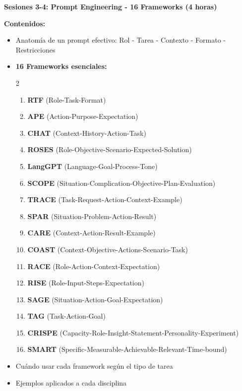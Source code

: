 \documentclass[12pt,a4paper]{yaac-luatex}
\newcommand{\subsecciontitulo}[1]{
	{\color{maincolor}\large\bfseries #1}
}
\begin{document}
	\vspace{0.3cm}
	
	\begin{tcolorbox}[
		enhanced,
		colback=white,
		colframe=curso1color,
		arc=3pt,
		boxrule=1.5pt,
		left=10pt,
		right=10pt,
		top=8pt,
		bottom=8pt,
		breakable
		]

		\subsecciontitulo{Sesiones 3-4: Prompt Engineering - 16 Frameworks (4 horas)}
	
	\textbf{Contenidos:}
	\begin{itemize}[leftmargin=*, itemsep=0.1cm]
		\item Anatomía de un prompt efectivo: Rol - Tarea - Contexto - Formato - Restricciones
		\item \textbf{16 Frameworks esenciales:}
		\begin{multicols}{2}
			\begin{enumerate}[leftmargin=*, itemsep=0.05cm]
				\item \textbf{RTF} (Role-Task-Format)
				\item \textbf{APE} (Action-Purpose-Expectation)
				\item \textbf{CHAT} (Context-History-Action-Task)
				\item \textbf{ROSES} (Role-Objective-Scenario-Expected-Solution)
				\item \textbf{LangGPT} (Language-Goal-Process-Tone)
				\item \textbf{SCOPE} (Situation-Complication-Objective-Plan-Evaluation)
				\item \textbf{TRACE} (Task-Request-Action-Context-Example)
				\item \textbf{SPAR} (Situation-Problem-Action-Result)
				\item \textbf{CARE} (Context-Action-Result-Example)
				\item \textbf{COAST} (Context-Objective-Actions-Scenario-Task)
				\item \textbf{RACE} (Role-Action-Context-Expectation)
				\item \textbf{RISE} (Role-Input-Steps-Expectation)
				\item \textbf{SAGE} (Situation-Action-Goal-Expectation)
				\item \textbf{TAG} (Task-Action-Goal)
				\item \textbf{CRISPE} (Capacity-Role-Insight-Statement-Personality-Experiment)
				\item \textbf{SMART} (Specific-Measurable-Achievable-Relevant-Time-bound)
			\end{enumerate}
		\end{multicols}
		\item Cuándo usar cada framework según el tipo de tarea
		\item Ejemplos aplicados a cada disciplina
	\end{itemize}
	

\end{tcolorbox}
\end{document}
